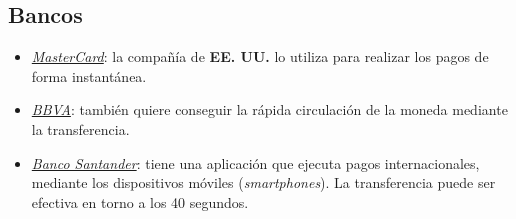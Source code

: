 \subsection{Bancos}
\begin{itemize}
	\item \underline{\textit{MasterCard}}: la compañía de \textbf{EE. UU.} lo utiliza para realizar los pagos de forma instantánea.
    \item \underline{\textit{BBVA}}:  también quiere conseguir la rápida circulación de la moneda mediante la transferencia. 
	\item \underline{\textit{Banco Santander}}: tiene una aplicación que ejecuta pagos internacionales, mediante los dispositivos móviles (\textit{smartphones}). La transferencia puede ser efectiva en torno a los 40 segundos. 
\end{itemize}






